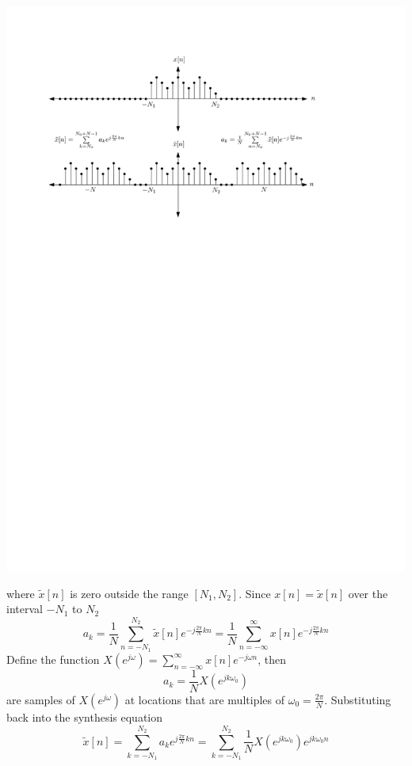 \begin{center}  
  \includegraphics[scale=0.8]{graphics/dt-derivation.pdf}
\end{center}
where $\tilde{x}[n]$ is zero outside the range $[N_1,N_2]$. Since $x[n] = \tilde{x}[n]$ over the interval $-N_1$ to $N_2$
\[
a_k = \frac{1}{N}\sum\limits_{n = -N_1}^{N_2} \tilde{x}[n] e^{-j\frac{2\pi}{N}kn} = \frac{1}{N}\sum\limits_{n = -\infty}^{\infty} x[n] e^{-j\frac{2\pi}{N}kn}
\]
Define the function $X\left(e^{j\omega}\right) = \sum\limits_{n = -\infty}^{\infty} x[n] e^{-j\omega n}$, then
\[
a_k = \frac{1}{N} X\left(e^{jk\omega_0}\right)
\]
are samples of $X\left(e^{j\omega}\right)$ at locations that are multiples of $\omega_0 = \frac{2\pi}{N}$. 
Substituting back into the synthesis equation
\[
\tilde{x}[n] = \sum\limits_{k = -N_1}^{N_2} a_k e^{j\frac{2\pi}{N}kn} = \sum\limits_{k = -N_1}^{N_2} \frac{1}{N} X\left(e^{jk\omega_0}\right) e^{jk\omega_0 n}
\]
